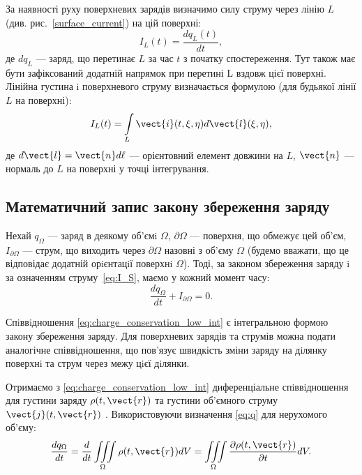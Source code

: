 \begin{itemize}
 За наявності руху поверхневих зарядів визначимо силу струму через лінію
$L$ (див. рис.~\ref{surface_current}) на цій поверхні:
\begin{equation}
    I_L(t) = \frac{dq_L(t)}{dt},
\end{equation}
де $dq_L$ --- заряд, що перетинає $L$ за час $ t$ з початку спостереження. Тут також
має бути зафіксований додатній напрямок при перетині L вздовж цієї поверхні.
Лінійна густина i поверхневого струму визначається формулою (для будьякої лінії $L$ на поверхні):
\begin{equation}
    I_L(t) = \int\limits_L \vect{i}(t, \xi, \eta) d\vect{l}(\xi, \eta),
\end{equation}
де $d\vect{l} = \vect{n} d \ell$ --- орієнтовний елемент довжини на $L$, $\vect{n}$ --- нормаль до $L$ на поверхні у
точці інтегрування.

\end{itemize}

\subsection*{Математичний запис закону збереження заряду}


Нехай $q_{\Omega}$ --- заряд в деякому об'ємi $\Omega$, $\partial\Omega$ --- поверхня, що обмежує цей
об'єм, $I_{\partial\Omega}$ --- струм, що виходить через $\partial\Omega$ назовні з об'єму $\Omega$ (будемо вважати,
що це відповідає додатній орiєнтацiї поверхнi $\Omega$). Тоді, за законом збереження заряду i за означенням струму~\eqref{eq:I_S}, маємо у кожний момент
часу:
\begin{equation}\label{eq:charge_conservation_low_int}
    \frac{dq_{\Omega}}{dt} + I_{\partial\Omega}   = 0.
\end{equation}

Спiввiдношення \eqref{eq:charge_conservation_low_int} є інтегральною формою закону збереження
заряду. Для поверхневих зарядів та струмів можна подати аналогічне
співвідношення, що пов’язує швидкість зміни заряду на дiлянку поверхнi та
струм через межу цiєї дiлянки.

Отримаємо з \eqref{eq:charge_conservation_low_int} диференціальне спiввiдношення для густини заряду
$\rho(t, \vect{r})$ та густини об'ємного струму $\vect{j}(t, \vect{r})$ . Використовуючи визначення \eqref{eq:q}
для нерухомого об'єму:
\begin{equation*}
    \frac{dq_{\Omega}}{dt} = \frac{d}{dt} \iiint\limits_{\Omega} \rho(t, \vect{r}) dV = \iiint\limits_{\Omega} \frac{\partial\rho(t, \vect{r})}{\partial
    t} dV.
\end{equation*}

